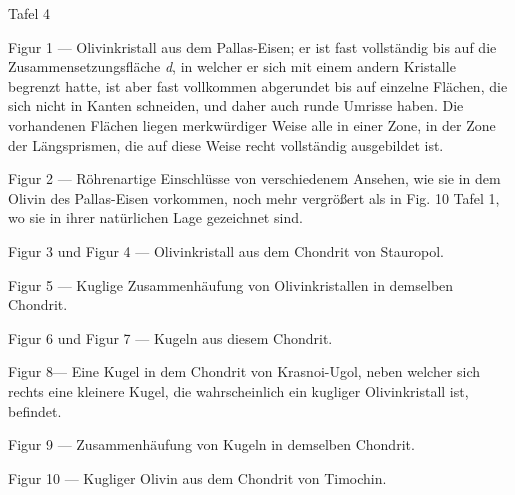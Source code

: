 \documentclass[a4paper, 11pt, oneside]{article}
\begin{document}
Tafel 4

Figur 1 --- Olivinkristall aus dem Pallas-Eisen; er ist fast vollständig bis auf die Zusammensetzungsfläche \emph{d}, in welcher er sich mit einem andern Kristalle begrenzt hatte, ist aber fast vollkommen abgerundet bis auf einzelne Flächen, die sich nicht in Kanten schneiden, und daher auch runde Umrisse haben. Die vorhandenen Flächen liegen merkwürdiger Weise alle in einer Zone, in der Zone der Längsprismen, die auf diese Weise recht vollständig ausgebildet ist.

Figur 2 --- Röhrenartige Einschlüsse von verschiedenem Ansehen, wie sie in dem Olivin des Pallas-Eisen vorkommen, noch mehr vergrößert als in Fig. 10 Tafel 1, wo sie in ihrer natürlichen Lage gezeichnet sind.

Figur 3 und Figur 4 --- Olivinkristall aus dem Chondrit von Stauropol.

Figur 5 --- Kuglige Zusammenhäufung von Olivinkristallen in demselben Chondrit.

Figur 6 und Figur 7 --- Kugeln aus diesem Chondrit.

Figur 8--- Eine Kugel in dem Chondrit von Krasnoi-Ugol, neben welcher sich rechts eine kleinere Kugel, die wahrscheinlich ein kugliger Olivinkristall ist, befindet.

Figur 9 --- Zusammenhäufung von Kugeln in demselben Chondrit.

Figur 10 --- Kugliger Olivin aus dem Chondrit von Timochin.
\clearpage
\end{document}
